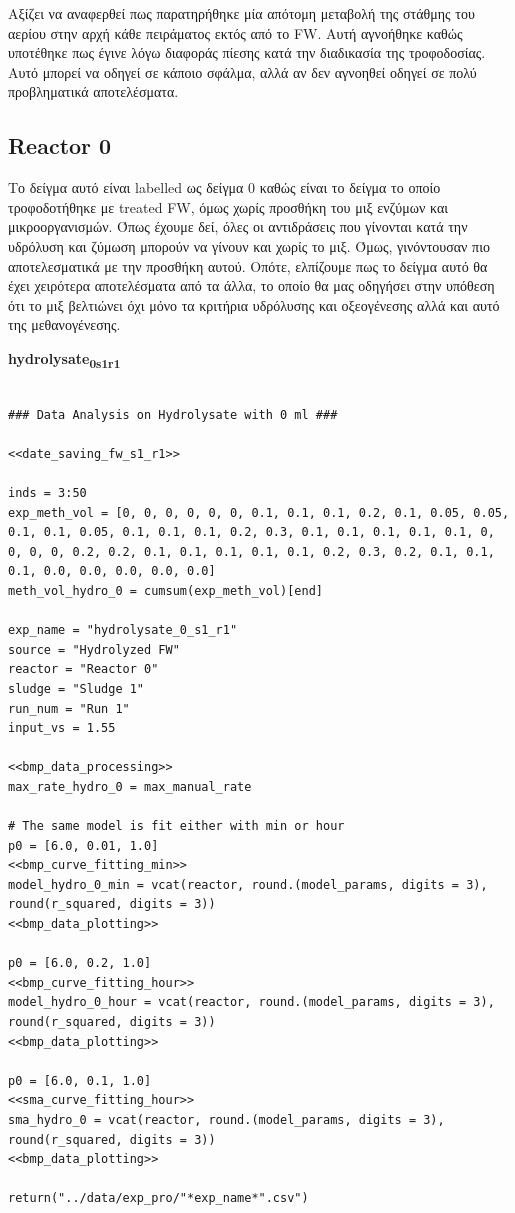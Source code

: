 \documentclass[11pt]{article}
\begin{document}
Αξίζει να αναφερθεί πως παρατηρήθηκε μία απότομη μεταβολή της στάθμης του αερίου στην αρχή κάθε πειράματος εκτός από το FW. Αυτή αγνοήθηκε καθώς υποτέθηκε πως έγινε λόγω διαφοράς πίεσης κατά την διαδικασία της τροφοδοσίας. Αυτό μπορεί να οδηγεί σε κάποιο σφάλμα, αλλά αν δεν αγνοηθεί οδηγεί σε πολύ προβληματικά αποτελέσματα.

\subsection{Reactor 0}
\label{sec:org7922370}
Το δείγμα αυτό είναι labelled ως δείγμα 0 καθώς είναι το δείγμα το οποίο τροφοδοτήθηκε με treated FW, όμως χωρίς προσθήκη του μιξ ενζύμων και μικροοργανισμών. Όπως έχουμε δεί, όλες οι αντιδράσεις που γίνονται κατά την υδρόλυση και ζύμωση μπορούν να γίνουν και χωρίς το μιξ. Όμως, γινόντουσαν πιο αποτελεσματικά με την προσθήκη αυτού. Οπότε, ελπίζουμε πως το δείγμα αυτό θα έχει χειρότερα αποτελέσματα από τα άλλα, το οποίο θα μας οδηγήσει στην υπόθεση ότι το μιξ βελτιώνει όχι μόνο τα κριτήρια υδρόλυσης και οξεογένεσης αλλά και αυτό της μεθανογένεσης.

\textbf{hydrolysate\textsubscript{0}\textsubscript{s1}\textsubscript{r1}}
\begin{verbatim}

### Data Analysis on Hydrolysate with 0 ml ###

<<date_saving_fw_s1_r1>>

inds = 3:50
exp_meth_vol = [0, 0, 0, 0, 0, 0, 0.1, 0.1, 0.1, 0.2, 0.1, 0.05, 0.05, 0.1, 0.1, 0.05, 0.1, 0.1, 0.1, 0.2, 0.3, 0.1, 0.1, 0.1, 0.1, 0.1, 0, 0, 0, 0, 0.2, 0.2, 0.1, 0.1, 0.1, 0.1, 0.1, 0.2, 0.3, 0.2, 0.1, 0.1, 0.1, 0.0, 0.0, 0.0, 0.0, 0.0]
meth_vol_hydro_0 = cumsum(exp_meth_vol)[end]

exp_name = "hydrolysate_0_s1_r1"
source = "Hydrolyzed FW"
reactor = "Reactor 0"
sludge = "Sludge 1"
run_num = "Run 1"
input_vs = 1.55

<<bmp_data_processing>>
max_rate_hydro_0 = max_manual_rate

# The same model is fit either with min or hour
p0 = [6.0, 0.01, 1.0]
<<bmp_curve_fitting_min>>
model_hydro_0_min = vcat(reactor, round.(model_params, digits = 3), round(r_squared, digits = 3))
<<bmp_data_plotting>>

p0 = [6.0, 0.2, 1.0]
<<bmp_curve_fitting_hour>>
model_hydro_0_hour = vcat(reactor, round.(model_params, digits = 3), round(r_squared, digits = 3))
<<bmp_data_plotting>>

p0 = [6.0, 0.1, 1.0]
<<sma_curve_fitting_hour>>
sma_hydro_0 = vcat(reactor, round.(model_params, digits = 3), round(r_squared, digits = 3))
<<bmp_data_plotting>>

return("../data/exp_pro/"*exp_name*".csv")
\end{verbatim}
\end{document}
